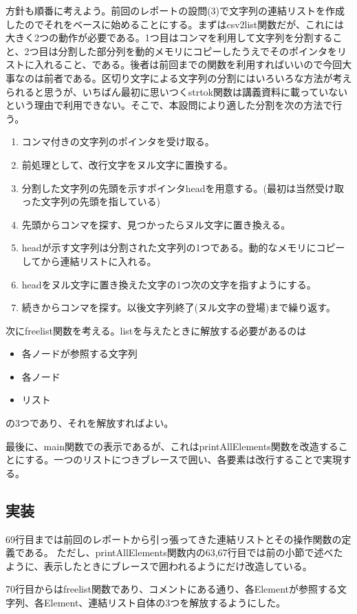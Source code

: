 \documentclass[dvipdfmx,12pt,a4j]{jarticle}
\begin{document}
方針も順番に考えよう。前回のレポートの設問(3)で文字列の連結リストを作成したのでそれをベースに始めることにする。まずはcsv2list関数だが、これには大きく2つの動作が必要である。1つ目はコンマを利用して文字列を分割すること、2つ目は分割した部分列を動的メモリにコピーしたうえでそのポインタをリストに入れること、である。後者は前回までの関数を利用すればいいので今回大事なのは前者である。区切り文字による文字列の分割にはいろいろな方法が考えられると思うが、いちばん最初に思いつくstrtok関数は講義資料に載っていないという理由で利用できない。そこで、本設問により適した分割を次の方法で行う。
\begin{enumerate}
  \item コンマ付きの文字列のポインタを受け取る。
  \item 前処理として、改行文字をヌル文字に置換する。
  \item 分割した文字列の先頭を示すポインタheadを用意する。(最初は当然受け取った文字列の先頭を指している)
  \item 先頭からコンマを探す、見つかったらヌル文字に置き換える。
  \item headが示す文字列は分割された文字列の1つである。動的なメモリにコピーしてから連結リストに入れる。
  \item headをヌル文字に置き換えた文字の1つ次の文字を指すようにする。
  \item 続きからコンマを探す。以後文字列終了(ヌル文字の登場)まで繰り返す。
\end{enumerate}
次にfreelist関数を考える。listを与えたときに解放する必要があるのは
\begin{itemize}
  \item 各ノードが参照する文字列
  \item 各ノード
  \item リスト
\end{itemize}
の3つであり、それを解放すればよい。

最後に、main関数での表示であるが、これはprintAllElements関数を改造することにする。一つのリストにつきブレースで囲い、各要素は改行することで実現する。

\subsection{実装}
69行目までは前回のレポートから引っ張ってきた連結リストとその操作関数の定義である。
ただし、printAllElements関数内の63,67行目では前の小節で述べたように、表示したときにブレースで囲われるようにだけ改造している。

70行目からはfreelist関数であり、コメントにある通り、各Elementが参照する文字列、各Element、連結リスト自体の3つを解放するようにした。
\end{document}
